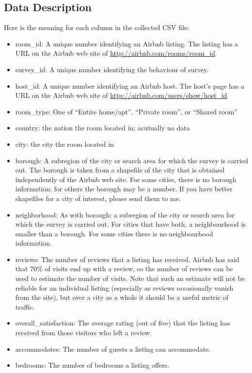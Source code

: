 \documentclass[12pt]{article}
\begin{document}
\subsection{Data Description}
Here is the meaning for each column in the collected CSV file:
\begin{itemize}
\item room\_id: A unique number identifying an Airbnb listing. The listing has a URL on the Airbnb web site of \url{http://airbnb.com/rooms/room_id}
\item survey\_id: A unique number identifying the behaviour of survey.
\item host\_id: A unique number identifying an Airbnb host. The host’s page has a URL on the Airbnb web site of \url{http://airbnb.com/users/show/host_id}
\item room\_type: One of “Entire home/apt”, “Private room”, or “Shared room”
\item country: the nation the room located in; acutually no data
\item city: the city the room located in
\item borough: A subregion of the city or search area for which the survey is carried out. The borough is taken from a shapefile of the
city that is obtained independently of the Airbnb web site. For some cities, there is no borough information; for others the borough may be a number. If you have better shapefiles for a city of interest, please send them to me.
\item neighborhood: As with borough: a subregion of the city or search area for which the survey is carried out. For cities that have both, a neighbourhood is smaller than a borough. For some cities there is no neighbourhood information.
\item reviews: The number of reviews that a listing has received. Airbnb has said that 70\% of visits end up with a review, so the number of reviews can be used to estimate the number of visits. Note that such an estimate will not be reliable for an individual listing (especially as reviews occasionally vanish from the site), but over a city as a whole it should be a useful metric of traffic.
\item overall\_satisfaction: The average rating (out of five) that the listing has received from those visitors who left a review.
\item accommodates: The number of guests a listing can accommodate.
\item bedrooms: The number of bedrooms a listing offers.

\end{itemize}
\end{document}
